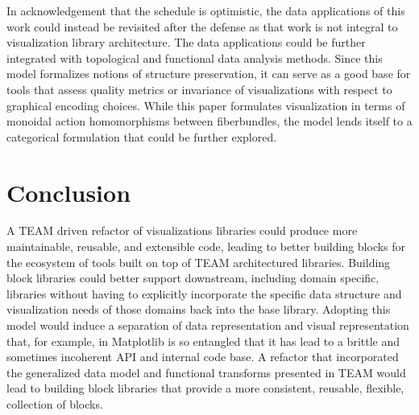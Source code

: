 \documentclass[../main.tex]{subfiles}
\begin{document}
In acknowledgement that the schedule is optimistic, the data applications of this work could instead be revisited after the defense as that work is not integral to visualization library architecture. The data applications could be further integrated with topological\cite{heineSurveyTopologybasedMethods2016} and functional \cite{ramsayFunctionalDataAnalysis2006a} data analysis methods. Since this model formalizes notions of structure preservation, it can serve as a good base for tools that assess quality metrics\cite{bertiniQualityMetricsHighdimensional2011a} or invariance \cite{kindlmannAlgebraicProcessVisualization2014} of visualizations with respect to graphical encoding choices. While this paper formulates visualization in terms of monoidal action homomorphisms between fiberbundles, the model lends itself to a categorical formulation\cite{fongInvitationAppliedCategory2019,milewskiCategoryTheoryProgrammers} that could be further explored. 

\section{Conclusion}
A TEAM driven refactor of visualizations libraries could produce more maintainable, reusable, and extensible code, leading to better building blocks for the ecosystem of tools built on top of TEAM architectured libraries. Building block libraries could better support downstream, including domain specific, libraries without having to explicitly incorporate the specific data structure and visualization needs of those domains back into the base library. Adopting this model would induce a separation of data representation and visual representation that, for example, in Matplotlib is so entangled that it has lead to a brittle and sometimes incoherent API and internal code base. A refactor that incorporated the generalized data model and functional transforms presented in TEAM would lead to building block libraries that provide a more consistent, reusable, flexible, collection of blocks. 
\end{document}

